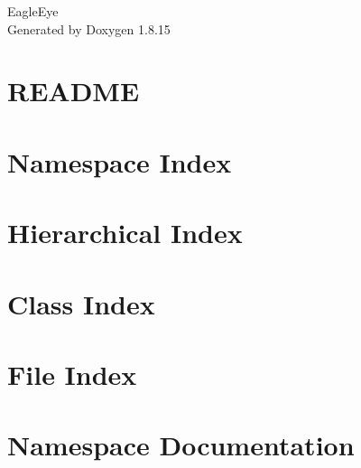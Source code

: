 \let\mypdfximage\pdfximage\def\pdfximage{\immediate\mypdfximage}\documentclass[twoside]{book}
\newcommand{\+}{\discretionary{\mbox{\scriptsize$\hookleftarrow$}}{}{}}
\newcommand{\clearemptydoublepage}{%
  \newpage{\pagestyle{empty}\cleardoublepage}%
}
\begin{document}
\hypersetup{pageanchor=false,
             bookmarksnumbered=true,
             pdfencoding=unicode
            }
\begin{titlepage}
\vspace*{7cm}
\begin{center}%
{\Large Eagle\+Eye }\\
\vspace*{1cm}
{\large Generated by Doxygen 1.8.15}\\
\end{center}
\end{titlepage}
\clearemptydoublepage
{}
\tableofcontents
\clearemptydoublepage
{}
\hypersetup{pageanchor=true}

\chapter{R\+E\+A\+D\+ME}
\label{md__c_1__gage__omega__programming__eagle_eye__eagle_eye__scripts__r_e_a_d_m_e}

\chapter{Namespace Index}

\chapter{Hierarchical Index}

\chapter{Class Index}

\chapter{File Index}

\chapter{Namespace Documentation}










\end{document}

